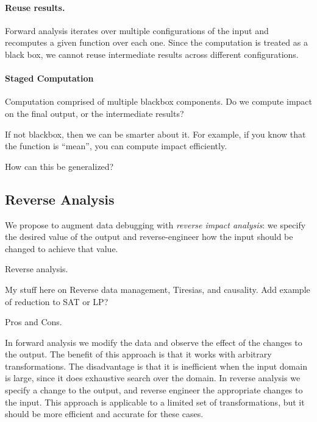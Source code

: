 \paragraph{Reuse results.} %
\label{par:reuse_results}
Forward analysis iterates over multiple configurations of the input and recomputes a given function over each one. Since the computation is treated as a black box, we cannot reuse intermediate results across different configurations.


\paragraph{Staged Computation} %
\label{par:staged_computation}
Computation comprised of multiple blackbox components. Do we compute impact on the final output, or the intermediate results?




If not blackbox, then we can be smarter about it. For example, if you know that the function is ``mean'', you can compute impact efficiently.

How can this be generalized?


\subsection{Reverse Analysis} %
\label{sub:reverse_analysis}
 We propose to augment data debugging with \emph{reverse impact analysis}: we specify the desired value of the output and reverse-engineer how the input should be changed to achieve that value. 


Reverse analysis.

My stuff here on Reverse data management, Tiresias, and causality. Add example of reduction to SAT or LP?

Pros and Cons.


In forward analysis we modify the data and observe the effect of the changes to the output. The benefit of this approach is that it works with arbitrary transformations. The disadvantage is that it is inefficient when the input domain is large, since it does exhaustive search over the domain. In reverse analysis we specify a change to the output, and reverse engineer the appropriate changes to the input. This approach is applicable to a limited set of transformations, but it should be more efficient and accurate for these cases.

